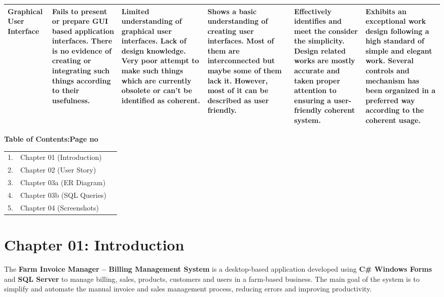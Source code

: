 \documentclass[12pt,a4paper]{article}
\begin{document}
{\begin{longtable}{|L{1.9cm}|L{2.3cm}|L{2.3cm}|L{2.3cm}|L{2.3cm}|L{2.3cm}|}
Graphical User Interface &
Fails to present or prepare GUI based application interfaces. There is no evidence of creating or integrating such things according to their usefulness. &
Limited understanding of graphical user interfaces. Lack of design knowledge. Very poor attempt to make such things which are currently obsolete or can't be identified as coherent. &
Shows a basic understanding of creating user interfaces. Most of them are interconnected but maybe some of them lack it. However, most of it can be described as user friendly. &
Effectively identifies and meet the consider the simplicity. Design related works are mostly accurate and taken proper attention to ensuring a user-friendly coherent system. &
Exhibits an exceptional work design following a high standard of simple and elegant work. Several controls and mechanism has been organized in a preferred way according to the coherent usage. \\ \hline
\end{longtable}
}

\clearpage
\textbf{\large Table of Contents:}\hfill\textbf{Page no}

\vspace{4pt}
\renewcommand{\arraystretch}{1.4}
\begin{tabularx}{\textwidth}{@{}l X r@{}}
1. & Chapter 01 (Introduction)\dotfill & \pageref{ch:intro} \\
2. & Chapter 02 (User Story)\dotfill & \pageref{ch:story} \\
3. & Chapter 03a (ER Diagram)\dotfill & \pageref{ch:er} \\
4. & Chapter 03b (SQL Queries)\dotfill & \pageref{ch:sql} \\
5. & Chapter 04 (Screenshots)\dotfill & \pageref{ch:screens} \\
\end{tabularx}

\section{Chapter 01: Introduction}\label{ch:intro}

The \textbf{Farm Invoice Manager -- Billing Management System} is a desktop-based application developed using \textbf{C\# Windows Forms} and \textbf{SQL Server} to manage billing, sales, products, customers and users in a farm-based business. The main goal of the system is to simplify and automate the manual invoice and sales management process, reducing errors and improving productivity.
\end{document}
